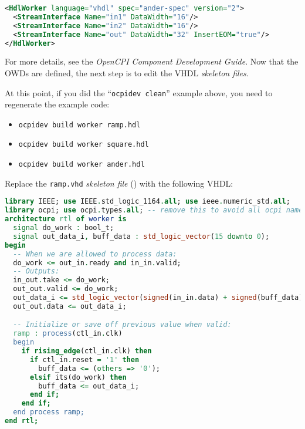 \begin{lstlisting}[language=xml]
<HdlWorker language="vhdl" spec="ander-spec" version="2">
  <StreamInterface Name="in1" DataWidth="16"/>
  <StreamInterface Name="in2" DataWidth="16"/>
  <StreamInterface Name="out" DataWidth="32" InsertEOM="true"/>
</HdlWorker>
\end{lstlisting}
\bend

For more details, see the \textit{OpenCPI Component Development Guide}. Now that the OWDs are defined, the next step is to edit the VHDL \textit{skeleton files}.

\bstart
At this point, if you did the ``\texttt{ocpidev clean}'' example above, you need to regenerate the example code:
\begin{itemize}
\setlength\itemsep{0pt}
\item \texttt{ocpidev build worker ramp.hdl}
\item \texttt{ocpidev build worker square.hdl}
\item \texttt{ocpidev build worker ander.hdl}


\end{itemize}
\bend
\bstart
Replace the \verb+ramp.vhd+ \textit{skeleton file} () with the following VHDL:
\begin{lstlisting}[language=vhdl, columns=fullflexible, breaklines=true, prebreak=\textbackslash, basicstyle=\ttfamily, showstringspaces=false, upquote=true]
library IEEE; use IEEE.std_logic_1164.all; use ieee.numeric_std.all;
library ocpi; use ocpi.types.all; -- remove this to avoid all ocpi name collisions
architecture rtl of worker is
  signal do_work : bool_t;
  signal out_data_i, buff_data : std_logic_vector(15 downto 0);
begin
  -- When we are allowed to process data:
  do_work <= out_in.ready and in_in.valid;
  -- Outputs:
  in_out.take <= do_work;
  out_out.valid <= do_work;
  out_data_i <= std_logic_vector(signed(in_in.data) + signed(buff_data));
  out_out.data <= out_data_i;

  -- Initialize or save off previous value when valid:
  ramp : process(ctl_in.clk)
  begin
    if rising_edge(ctl_in.clk) then
      if ctl_in.reset = '1' then
        buff_data <= (others => '0');
      elsif its(do_work) then
        buff_data <= out_data_i;
      end if;
    end if;
  end process ramp;
end rtl;
\end{lstlisting}
